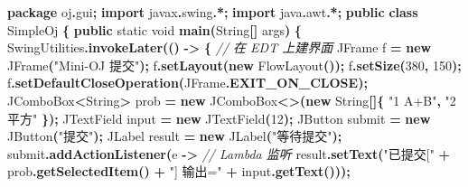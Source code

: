 \documentclass[
  11pt,
]{ctexart}
\newenvironment{Shaded}{\begin{snugshade}}{\end{snugshade}}
\newcommand{\BuiltInTok}[1]{#1}
\newcommand{\CommentTok}[1]{\textcolor[rgb]{0.56,0.35,0.01}{\textit{#1}}}
\newcommand{\DataTypeTok}[1]{\textcolor[rgb]{0.13,0.29,0.53}{#1}}
\newcommand{\DecValTok}[1]{\textcolor[rgb]{0.00,0.00,0.81}{#1}}
\newcommand{\FunctionTok}[1]{\textcolor[rgb]{0.13,0.29,0.53}{\textbf{#1}}}
\newcommand{\ImportTok}[1]{#1}
\newcommand{\KeywordTok}[1]{\textcolor[rgb]{0.13,0.29,0.53}{\textbf{#1}}}
\newcommand{\NormalTok}[1]{#1}
\newcommand{\OperatorTok}[1]{\textcolor[rgb]{0.81,0.36,0.00}{\textbf{#1}}}
\newcommand{\StringTok}[1]{\textcolor[rgb]{0.31,0.60,0.02}{#1}}
\begin{document}
\begin{Shaded}
\begin{Highlighting}[]
\KeywordTok{package}\ImportTok{ oj}\OperatorTok{.}\ImportTok{gui}\OperatorTok{;}
\KeywordTok{import} \ImportTok{javax}\OperatorTok{.}\ImportTok{swing}\OperatorTok{.*;}
\KeywordTok{import} \ImportTok{java}\OperatorTok{.}\ImportTok{awt}\OperatorTok{.*;}
\KeywordTok{public} \KeywordTok{class}\NormalTok{ SimpleOj }\OperatorTok{\{}
    \KeywordTok{public} \DataTypeTok{static} \DataTypeTok{void} \FunctionTok{main}\OperatorTok{(}\BuiltInTok{String}\OperatorTok{[]}\NormalTok{ args}\OperatorTok{)} \OperatorTok{\{}
        \BuiltInTok{SwingUtilities}\OperatorTok{.}\FunctionTok{invokeLater}\OperatorTok{(()} \OperatorTok{{-}\textgreater{}} \OperatorTok{\{}                   \CommentTok{// 在 EDT 上建界面}
            \BuiltInTok{JFrame}\NormalTok{ f }\OperatorTok{=} \KeywordTok{new} \BuiltInTok{JFrame}\OperatorTok{(}\StringTok{"Mini{-}OJ 提交"}\OperatorTok{);}
\NormalTok{            f}\OperatorTok{.}\FunctionTok{setLayout}\OperatorTok{(}\KeywordTok{new} \BuiltInTok{FlowLayout}\OperatorTok{());}
\NormalTok{            f}\OperatorTok{.}\FunctionTok{setSize}\OperatorTok{(}\DecValTok{380}\OperatorTok{,} \DecValTok{150}\OperatorTok{);}
\NormalTok{            f}\OperatorTok{.}\FunctionTok{setDefaultCloseOperation}\OperatorTok{(}\BuiltInTok{JFrame}\OperatorTok{.}\FunctionTok{EXIT\_ON\_CLOSE}\OperatorTok{);}
            \BuiltInTok{JComboBox}\OperatorTok{\textless{}}\BuiltInTok{String}\OperatorTok{\textgreater{}}\NormalTok{ prob }\OperatorTok{=} \KeywordTok{new} \BuiltInTok{JComboBox}\OperatorTok{\textless{}\textgreater{}(}\KeywordTok{new} \BuiltInTok{String}\OperatorTok{[]\{} \StringTok{"1 A+B"}\OperatorTok{,} \StringTok{"2 平方"} \OperatorTok{\});}
            \BuiltInTok{JTextField}\NormalTok{ input }\OperatorTok{=} \KeywordTok{new} \BuiltInTok{JTextField}\OperatorTok{(}\DecValTok{12}\OperatorTok{);}
            \BuiltInTok{JButton}\NormalTok{ submit }\OperatorTok{=} \KeywordTok{new} \BuiltInTok{JButton}\OperatorTok{(}\StringTok{"提交"}\OperatorTok{);}
            \BuiltInTok{JLabel}\NormalTok{ result }\OperatorTok{=} \KeywordTok{new} \BuiltInTok{JLabel}\OperatorTok{(}\StringTok{"等待提交"}\OperatorTok{);}
\NormalTok{            submit}\OperatorTok{.}\FunctionTok{addActionListener}\OperatorTok{(}\NormalTok{e }\OperatorTok{{-}\textgreater{}}                    \CommentTok{// Lambda 监听}
\NormalTok{                result}\OperatorTok{.}\FunctionTok{setText}\OperatorTok{(}\StringTok{"已提交["} \OperatorTok{+}\NormalTok{ prob}\OperatorTok{.}\FunctionTok{getSelectedItem}\OperatorTok{()} \OperatorTok{+} \StringTok{"] 输出="} \OperatorTok{+}\NormalTok{ input}\OperatorTok{.}\FunctionTok{getText}\OperatorTok{()));}

\end{Highlighting}
\end{Shaded}
\end{document}
